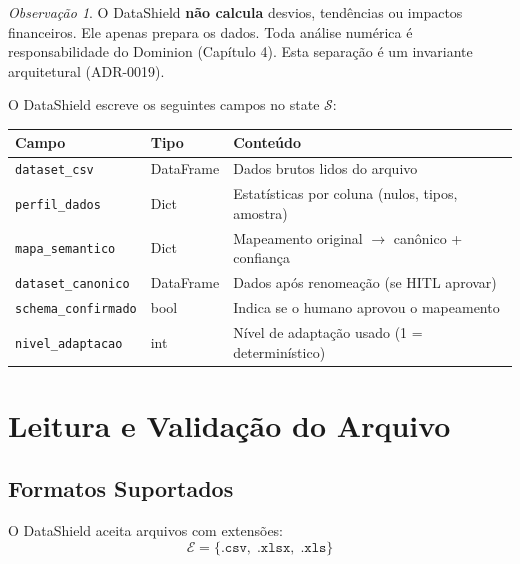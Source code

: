 \documentclass[a4paper, 12pt]{report}
\theoremstyle{definition}
\theoremstyle{remark}
\newtheorem{observacao}{Observa\c{c}\~ao}[chapter]
\newcommand{\state}{\mathcal{S}}
\begin{document}
\begin{observacao}
  O DataShield \textbf{n\~ao calcula} desvios, tend\^encias ou impactos financeiros.
  Ele apenas prepara os dados. Toda an\'alise num\'erica \'e responsabilidade
  do Dominion (Cap\'itulo 4). Esta separa\c{c}\~ao \'e um invariante
  arquitetural (ADR-0019).
\end{observacao}

O DataShield escreve os seguintes campos no state $\state$:

\begin{center}
\begin{tabular}{llp{7cm}}
  \toprule
  \textbf{Campo} & \textbf{Tipo} & \textbf{Conte\'udo} \\
  \midrule
  \texttt{dataset\_csv} & DataFrame & Dados brutos lidos do arquivo \\
  \texttt{perfil\_dados} & Dict & Estat\'isticas por coluna (nulos, tipos, amostra) \\
  \texttt{mapa\_semantico} & Dict & Mapeamento original $\to$ can\^onico + confian\c{c}a \\
  \texttt{dataset\_canonico} & DataFrame & Dados ap\'os renomea\c{c}\~ao (se HITL aprovar) \\
  \texttt{schema\_confirmado} & bool & Indica se o humano aprovou o mapeamento \\
  \texttt{nivel\_adaptacao} & int & N\'ivel de adapta\c{c}\~ao usado (1 = determin\'istico) \\
  \bottomrule
\end{tabular}
\end{center}


\section{Leitura e Valida\c{c}\~ao do Arquivo}

\subsection{Formatos Suportados}

O DataShield aceita arquivos com extens\~oes:
\[
  \mathcal{E} = \{\texttt{.csv},\; \texttt{.xlsx},\; \texttt{.xls}\}
\]
\end{document}
